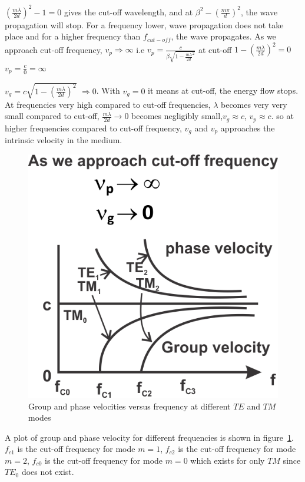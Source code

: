 $(\frac{m\lambda}{2d})^{2} -1=0$ gives the cut-off wavelength, and at $\beta^{2} -(\frac{m\pi}{d})^{2}$, the wave propagation will stop. For a frequency lower, wave propagation does not take place and for a higher frequency than $f_{cut-off}$, the wave propagates. As we approach cut-off frequency, $v_{p}\Rightarrow \infty$ i.e $v_{p}= \frac{c}{\beta \sqrt{1- \frac{m \lambda}{2d}^{2}}}$ at cut-off $1 - (\frac{m\lambda}{2d})^{2}=0$ $v_{p} =\frac{c}{0} =\infty$

$v_{g} =c \sqrt{1-(\frac{m\lambda}{2d})^{2}}$ $\Rightarrow 0$. With $v_{g} = 0$ it means at cut-off, the energy flow stops. At frequencies very high compared to cut-off frequencies, $\lambda$ becomes very very small compared to cut-off, $\frac{m\lambda}{2d} \rightarrow 0$ becomes negligibly small,$v_{g} \approx c$, $v_{p} \approx c$. so at higher frequencies compared to cut-off frequency, $v_{g}$ and $v_{p}$ approaches the intrinsic velocity in the medium.
\begin{figure}[h]
\centering
\includegraphics[scale=1]{./graphics/silas5}
\caption{Group and phase velocities versus frequency at different $TE$ and $TM$ modes}
\label{fig:silas5}
\end{figure}
A plot of group and phase velocity for different frequencies is shown in figure~\ref{fig:silas5}. $f_{c1}$ is the cut-off frequency for mode $m=1$, $f_{c2}$ is the cut-off frequency for mode $m=2$, $f_{c0}$ is the cut-off frequency for mode $m=0$ which exists for only $TM$ since $TE_0$ does not exist.

